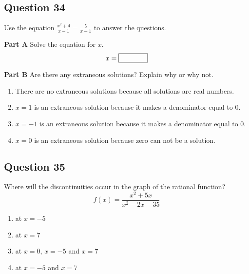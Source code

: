 \documentclass[12pt]{article}
\begin{document}
\subsection*{Question 34}
Use the equation \( \frac{x^2 + 4}{x - 1} = \frac{5}{x - 1} \) to answer the questions.

\textbf{Part A}
Solve the equation for \(x\).
\[ x = \framebox[1.5cm]{\phantom{X}} \]

\textbf{Part B}
Are there any extraneous solutions? Explain why or why not.
\begin{enumerate}[label=\Alph*.]
    \item There are no extraneous solutions because all solutions are real numbers.
    \item \( x = 1 \) is an extraneous solution because it makes a denominator equal to 0.
    \item \( x = -1 \) is an extraneous solution because it makes a denominator equal to 0.
    \item \( x = 0 \) is an extraneous solution because zero can not be a solution.
\end{enumerate}

\subsection*{Question 35}
Where will the discontinuities occur in the graph of the rational function?
\[ f(x) = \frac{x^2 + 5x}{x^2 - 2x - 35} \]
\begin{enumerate}[label=\Alph*.]
    \item at \( x = -5 \)
    \item at \( x = 7 \)
    \item at \( x = 0 \), \( x = -5 \) and \( x = 7 \)
    \item at \( x = -5 \) and \( x = 7 \)
\end{enumerate}

\end{document}
